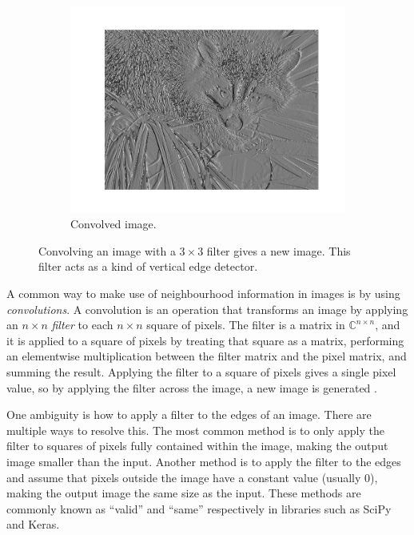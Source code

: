\begin{figure}
\begin{subfigure}[t]{0.3\textwidth}
            \end{subfigure}%
            ~
            \begin{subfigure}[t]{0.3\textwidth}
                \centering
                \includegraphics[width=\textwidth]{images/face_convolved.png}
                \caption{Convolved image.}
                \label{fig:convolution-face-convolved}
            \end{subfigure}
            \caption{Convolving an image with a $3 \times 3$ filter gives a new
                image. This filter acts as a kind of vertical edge detector.}
            \label{fig:convolved-face}
        \end{figure}

        A common way to make use of neighbourhood information in images is by
        using \emph{convolutions}. A convolution is an operation that transforms
        an image by applying an $n \times n$ \emph{filter} to each $n \times n$
        square of pixels. The filter is a matrix in $\mathbb{C}^{n \times n}$,
        and it is applied to a square of pixels by treating that square as a
        matrix, performing an elementwise multiplication between the filter
        matrix and the pixel matrix, and summing the result. Applying the filter
        to a square of pixels gives a single pixel value, so by applying the
        filter across the image, a new image is generated \citep{ludwig15}.

        One ambiguity is how to apply a filter to the edges of an image. There
        are multiple ways to resolve this. The most common method is to only
        apply the filter to squares of pixels fully contained within the image,
        making the output image smaller than the input. Another method is to
        apply the filter to the edges and assume that pixels outside the image
        have a constant value (usually 0), making the output image the same size
        as the input. These methods are commonly known as ``valid'' and ``same''
        respectively in libraries such as SciPy and Keras.

